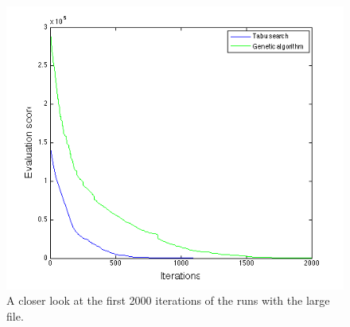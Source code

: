 \documentclass[titlepage,a4paper]{article}
\begin{document}
\begin{figure}[H]
  \begin{center}
    \includegraphics[scale=0.6]{../results/plot_medium_zoomed.png}
  \end{center}
  \caption{A closer look at the first 2000 iterations of the runs with the large file.}
  \label{plot_large_zoomed}
\end{figure}
\end{document}
